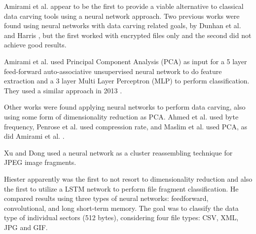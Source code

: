 
Amirami et al.  \cite{amirani_new_2008} appear to be the first 
to provide a viable alternative to classical data carving tools using a neural network approach. Two previous works were found using neural networks with data carving related goals, by Dunhan et al. \cite{dunham_classifying_2005} and Harris \cite{harris_using_2007}, but the first worked with encrypted files only and the second did not achieve good results.

Amirami et al.  \cite{amirani_new_2008} used Principal Component Analysis (PCA) as input for a 5 layer feed-forward auto-associative unsupervised neural network to do feature extraction and a 3 layer Multi Layer Perceptron (MLP) to perform classification. They used a similar approach in 2013 \cite{amirani_feature-based_2013}.

Other works were found applying neural networks to perform data carving, also using some form of dimensionality reduction as PCA. Ahmed et al. \cite{ahmed_content-based_2010}\cite{ahmed_fast_2011} used byte frequency, 
Penrose et al. \cite{penrose_approaches_2013} used compression rate,
and Maslim et al. \cite{maslim_distributed_2014} used PCA, as did Amirami et al.  \cite{amirani_new_2008}.

Xu and Dong \cite{xu_reassembling_2009} used a neural network as a cluster reassembling technique for JPEG image fragments.

Hiester \cite{hiester_file_2018} apparently was the first to not resort to dimensionality reduction and also the first to utilize a LSTM network to perform file fragment classification. He compared results using three types of neural networks: feedforward, convolutional, and long short-term memory. The goal was to classify the data type of individual sectors (512 bytes), considering four file types: CSV, XML, JPG and GIF.

% 